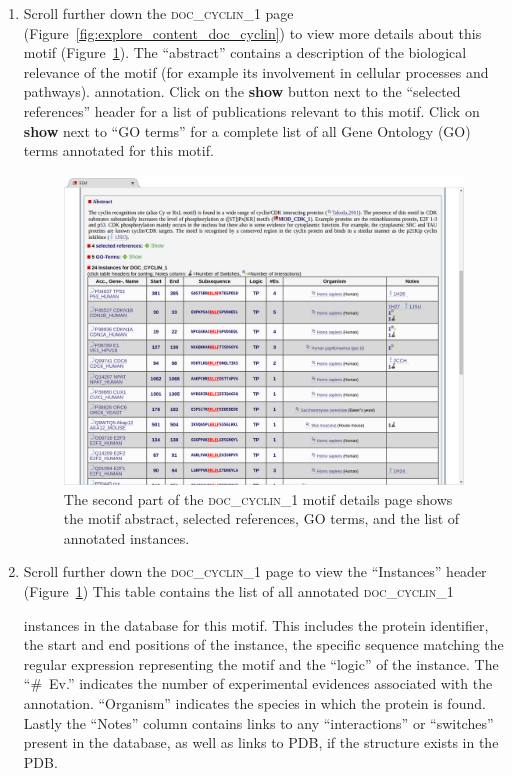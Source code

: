 \documentclass[12pt]{article}
\newcommand\button[1]{%
	\textbf{#1}%
}
\newcommand\motif[1]{%
    \textsc{\lowercase{#1}}%
}
\begin{document}
\begin{enumerate}
	\item Scroll further down the \motif{DOC\_CYCLIN\_1} page
		(Figure~\ref{fig:explore_content_doc_cyclin}) to view
		more details about this motif
		(Figure~\ref{fig:explore_content_doc_cyclin_1_abstract_instances}).
	    The ``abstract'' contains a description of the biological relevance of the
	    motif (for example its involvement in cellular processes and pathways).
		annotation. Click on the \button{show} button next to the ``selected
		references'' header for a list of publications relevant to this motif.
		Click on \button{show} next to ``GO terms'' for a complete list of all
		Gene Ontology (GO) terms annotated for this motif.

	\begin{figure}[h!]
		\centering
		\includegraphics[width=\textwidth]{Figures/explore_content/doc_cyclin_1_abstract_instances.png}
		\caption{
			The second part of the \motif{DOC\_CYCLIN\_1} motif details page
			shows the motif abstract, selected references, GO terms, and the list of annotated
			instances.
		}
		\label{fig:explore_content_doc_cyclin_1_abstract_instances}
	\end{figure}

	\item Scroll further down the \motif{DOC\_CYCLIN\_1} page to view
		the ``Instances'' header
		(Figure~\ref{fig:explore_content_doc_cyclin_1_abstract_instances})
		This table contains the list of all annotated \motif{DOC\_CYCLIN\_1}
		instances in the database for this motif. This includes the protein
		identifier, the start and end positions of the instance, the specific
		sequence matching the regular expression representing the motif and
		the ``logic'' of the instance.
		The ``\#~Ev.'' indicates the number of experimental evidences
		associated with the annotation. ``Organism'' indicates the 
		species in which the protein is found. Lastly the ``Notes'' column
		contains links to any ``interactions'' or ``switches'' present in the
		database, as well as links to PDB, if the structure exists in the PDB.


\end{enumerate}
\end{document}
